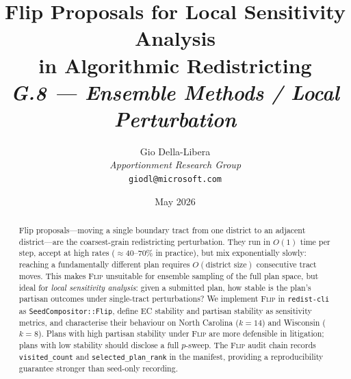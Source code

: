 \documentclass[12pt]{article}
\title{%
  \textbf{Flip Proposals for Local Sensitivity Analysis}\\
  \textbf{in Algorithmic Redistricting}\\[0.8em]
  \normalsize\textit{G.8 --- Ensemble Methods / Local Perturbation}%
}
\author{%
  Gio Della-Libera\\
  \textit{Apportionment Research Group}\\
  \small\texttt{giodl@microsoft.com}
}
\date{May 2026}
\newcommand{\flip}{\textsc{Flip}}
\begin{document}
\maketitle

\begin{abstract}
\noindent
Flip proposals---moving a single boundary tract from one district to an
adjacent district---are the coarsest-grain redistricting perturbation.
They run in $O(1)$ time per step, accept at high rates ($\approx$40--70\%
in practice), but mix exponentially slowly: reaching a fundamentally
different plan requires $O(\text{district size})$ consecutive tract moves.
This makes \flip{} unsuitable for ensemble sampling of the full plan space,
but ideal for \emph{local sensitivity analysis}: given a submitted plan, how
stable is the plan's partisan outcomes under single-tract perturbations?
We implement \flip{} in \texttt{redist-cli} as \texttt{SeedCompositor::Flip},
define EC stability and partisan stability as sensitivity metrics, and
characterise their behaviour on North Carolina ($k=14$) and Wisconsin ($k=8$).
Plans with high partisan stability under \flip{} are more defensible in
litigation; plans with low stability should disclose a full $p$-sweep.
The \flip{} audit chain records \texttt{visited\_count} and
\texttt{selected\_plan\_rank} in the manifest, providing a reproducibility
guarantee stronger than seed-only recording.
\end{abstract}

\tableofcontents
\newpage










\end{document}
